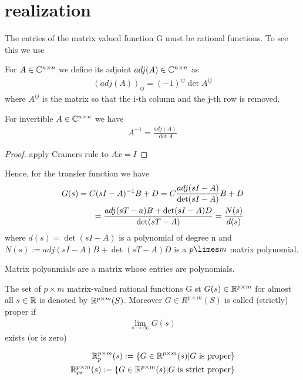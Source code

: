 \section{realization} 

The entries of the matrix valued function G must be rational functions. To see this we use

\begin{defi}
	For $A \in \mathbb{C}^{n \times n}$ we define its adjoint $adj(A) \in \mathbb{C}^{n \times n}$ as
	\begin{align*}
		(adj(A))_{ij}= (-1)^{ij} \det A^{ij}
	\end{align*}
	where $A^{ij}$ is the matrix so that the i-th column and the j-th row is removed. 
\end{defi}

\begin{thm}
	For invertible $A \in \mathbb{C}^{n \times n } $ we have 
	\begin{align*}
		A^{-1}= \frac{adj(A)}{\det A}
	\end{align*} 
\end{thm}
\begin{proof}
	apply Cramers rule to $Ax=I$
\end{proof}

Hence, for the transfer function we have 
\begin{align}
\label{eq:N(s)}
	G(s)=C(sI-A)^{-1}B+D= C \frac{adj(sI-A)}{\det (sI-A)} B + D \notag \\
	= \frac{adj(sT-a)B+\det (sI-A) D}{\det (sT-A)}= \frac{N(s)}{d(s)}
\end{align}
where $d(s)=\det(sI-A)$ is a polynomial of degree n and $N(s):= adj(sI-A)B+\det(sT-A)D$ is a $p \limes m$ matrix polynomial. 

Matrix polyonmials are a matrix whose entries are polynomials. 

\begin{defi}
	The set of $p \times m$ matrix-valued rational functions G st $G(s) \in \mathbb{R}^{p \times m}$ for almost all $s \in \mathbb{R} $ is denoted by $\mathbb{R}^{p \times m}(S)$. Moreover $G \in R^{p \times m}(S)$ is called (strictly) proper if \begin{align*}
		\lim\limits_{s \rightarrow \infty} G(s)
	\end{align*}
	exists (or is zero) 
\end{defi}

\begin{align*}
	\mathbb{R}^{p \times m}_p(s):= \{G \in \mathbb{R}^{p \times m}(s)| G \text{ is proper} \} \\
	\mathbb{R}^{p \times m}_{ps}(s):= \{G \in \mathbb{R}^{p \times m}(s)| G \text{ is strict proper} \} 
\end{align*}

